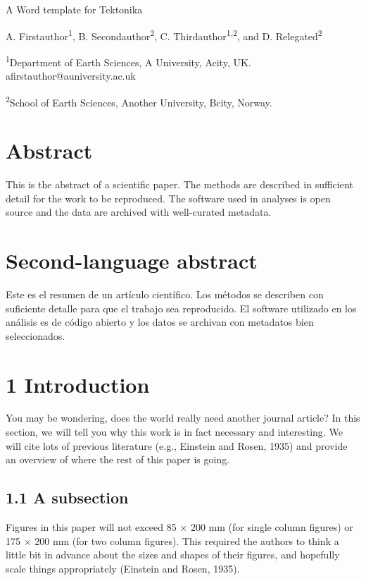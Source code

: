 \documentclass[
]{article}
\author{}
\date{}
\begin{document}
A Word template for Tektonika

A. Firstauthor\textsuperscript{1}, B. Secondauthor\textsuperscript{2}, C. Thirdauthor\textsuperscript{1,2}, and D. Relegated\textsuperscript{2}

\textsuperscript{1}Department of Earth Sciences, A University, Acity, UK. afirstauthor@auniversity.ac.uk

\textsuperscript{2}School of Earth Sciences, Another University, Bcity, Norway.

\hypertarget{abstract}{%
\section{Abstract}\label{abstract}}

This is the abstract of a scientific paper. The methods are described in sufficient detail for the work to be reproduced. The software used in analyses is open source and the data are archived with well-curated metadata.

\hypertarget{second-language-abstract}{%
\section{\texorpdfstring{Second-language abstract }{Second-language abstract }}\label{second-language-abstract}}

Este es el resumen de un artículo científico. Los métodos se describen con suficiente detalle para que el trabajo sea reproducido. El software utilizado en los análisis es de código abierto y los datos se archivan con metadatos bien seleccionados.

\hypertarget{introduction}{%
\section{1 Introduction}\label{introduction}}

You may be wondering, does the world really need another journal article? In this section, we will tell you why this work is in fact necessary and interesting. We will cite lots of previous literature (e.g., Einstein and Rosen, 1935) and provide an overview of where the rest of this paper is going.

\hypertarget{a-subsection}{%
\subsection{1.1 A subsection}\label{a-subsection}}

Figures in this paper will not exceed 85 × 200 mm (for single column figures) or 175 × 200 mm (for two column figures). This required the authors to think a little bit in advance about the sizes and shapes of their figures, and hopefully scale things appropriately (Einstein and Rosen, 1935).
\end{document}
